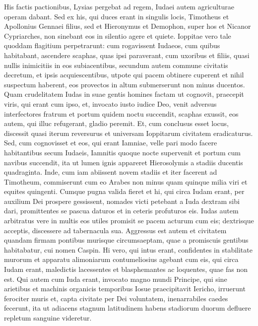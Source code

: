 \begin{biblechapter}  
\verse His factis pactionibus, Lysias pergebat ad regem, Iudaei autem agriculturae operam dabant. 
\verse Sed ex his, qui duces erant in singulis locis, Timotheus et Apollonius Gennaei filius, sed et Hieronymus et Demophon, super hos et Nicanor Cypriarches, non sinebant eos in silentio agere et quiete. 
\verse Ioppitae vero tale quoddam flagitium perpetrarunt: cum rogavissent Iudaeos, cum quibus habitabant, ascendere scaphas, quas ipsi paraverant, cum uxoribus et filiis, quasi nullis inimicitiis in eos subiacentibus, 
\verse secundum autem commune civitatis decretum, et ipsis acquiescentibus, utpote qui pacem obtinere cuperent et nihil suspectum haberent, eos provectos in altum submerserunt non minus ducentos. 
\verse Quam crudelitatem Iudas in suae gentis homines factam ut cognovit, praecepit viris, qui erant cum ipso, et, invocato iusto iudice Deo,  
\verse venit adversus interfectores fratrum et portum quidem noctu succendit, scaphas exussit, eos autem, qui illuc refugerant, gladio peremit. 
\verse Et, cum conclusus esset locus, discessit quasi iterum reversurus et universam Ioppitarum civitatem eradicaturus. 
\verse Sed, cum cognovisset et eos, qui erant Iamniae, velle pari modo facere habitantibus secum Iudaeis, 
\verse Iamnitis quoque nocte supervenit et portum cum navibus succendit, ita ut lumen ignis appareret Hierosolymis a stadiis ducentis quadraginta. 
\verse Inde, cum iam abiissent novem stadiis et iter facerent ad Timotheum, commiserunt cum eo Arabes non minus quam quinque milia viri et equites quingenti. 
\verse Cumque pugna valida fieret et hi, qui circa Iudam erant, per auxilium Dei prospere gessissent, nomades victi petebant a Iuda dextram sibi dari, promittentes se pascua daturos et in ceteris profuturos eis. 
\verse Iudas autem arbitratus vere in multis eos utiles promisit se pacem acturum cum eis; dextrisque acceptis, discessere ad tabernacula sua. 
\verse Aggressus est autem et civitatem quandam firmam pontibus murisque circumsaeptam, quae a promiscuis gentibus habitabatur, cui nomen Caspin. 
\verse Hi vero, qui intus erant, confidentes in stabilitate murorum et apparatu alimoniarum contumeliosius agebant cum eis, qui circa Iudam erant, maledictis lacessentes et blasphemantes ac loquentes, quae fas non est. 
\verse Qui autem cum Iuda erant, invocato magno mundi Principe, qui sine arietibus et machinis organicis temporibus Iosue praecipitavit Iericho, irruerunt ferociter muris 
\verse et, capta civitate per Dei voluntatem, inenarrabiles caedes fecerunt, ita ut adiacens stagnum latitudinem habens stadiorum duorum defluere repletum sanguine videretur. 

\end{biblechapter}
